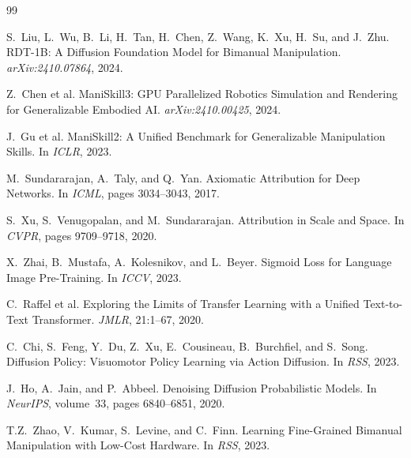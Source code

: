 \documentclass[11pt,a4paper]{article}
\begin{document}
\begin{thebibliography}{99}

S.\ Liu, L.\ Wu, B.\ Li, H.\ Tan, H.\ Chen, Z.\ Wang, K.\ Xu, H.\ Su, and J.\ Zhu.
\newblock RDT-1B: A Diffusion Foundation Model for Bimanual Manipulation.
\newblock \emph{arXiv:2410.07864}, 2024.

Z.\ Chen et al.
\newblock ManiSkill3: GPU Parallelized Robotics Simulation and Rendering for
Generalizable Embodied AI.
\newblock \emph{arXiv:2410.00425}, 2024.

J.\ Gu et al.
\newblock ManiSkill2: A Unified Benchmark for Generalizable Manipulation Skills.
\newblock In \emph{ICLR}, 2023.

M.\ Sundararajan, A.\ Taly, and Q.\ Yan.
\newblock Axiomatic Attribution for Deep Networks.
\newblock In \emph{ICML}, pages 3034--3043, 2017.

S.\ Xu, S.\ Venugopalan, and M.\ Sundararajan.
\newblock Attribution in Scale and Space.
\newblock In \emph{CVPR}, pages 9709--9718, 2020.

X.\ Zhai, B.\ Mustafa, A.\ Kolesnikov, and L.\ Beyer.
\newblock Sigmoid Loss for Language Image Pre-Training.
\newblock In \emph{ICCV}, 2023.

C.\ Raffel et al.
\newblock Exploring the Limits of Transfer Learning with a Unified
Text-to-Text Transformer.
\newblock \emph{JMLR}, 21:1--67, 2020.

C.\ Chi, S.\ Feng, Y.\ Du, Z.\ Xu, E.\ Cousineau, B.\ Burchfiel, and S.\ Song.
\newblock Diffusion Policy: Visuomotor Policy Learning via Action Diffusion.
\newblock In \emph{RSS}, 2023.

J.\ Ho, A.\ Jain, and P.\ Abbeel.
\newblock Denoising Diffusion Probabilistic Models.
\newblock In \emph{NeurIPS}, volume~33, pages 6840--6851, 2020.

T.Z.\ Zhao, V.\ Kumar, S.\ Levine, and C.\ Finn.
\newblock Learning Fine-Grained Bimanual Manipulation with Low-Cost Hardware.
\newblock In \emph{RSS}, 2023.

\end{thebibliography}
\end{document}
